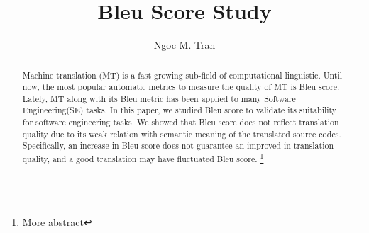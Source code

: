 \documentclass[sigconf,review, anonymous]{acmart}
\begin{document}
\title{Bleu Score Study}



\author{Ngoc M. Tran}




\begin{abstract}
Machine translation (MT) is a fast growing sub-field of computational linguistic. Until now, the most popular automatic metrics to measure the quality of MT is Bleu score. Lately, MT along with its Bleu metric has been applied to many Software Engineering(SE) tasks. In this paper, we studied Bleu score to validate its suitability for software engineering tasks. We showed that Bleu score does not reflect translation quality due to its weak relation with semantic meaning of the translated source codes. Specifically, an increase in Bleu score does not guarantee an improved in translation quality, and a good translation may have fluctuated Bleu score.  
\footnote{More abstract}
\end{abstract}

%
%




\maketitle





\end{document}
